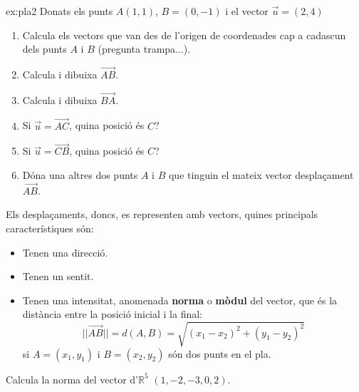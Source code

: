 \documentclass{beamer}
\begin{document}
\begin{frame}

\begin{exercise}{ex:pla2}{}
Donats els punts $A(1,1)$, $B=(0,-1)$ i el vector $\vec{u}=(2,4)$
\begin{enumerate}
  \item Calcula els vectors que van des de l'origen de coordenades cap a cadascun dels punts $A$ i $B$ (pregunta trampa...).
  \item Calcula i dibuixa $\overrightarrow{AB}$.
  \item Calcula i dibuixa $\overrightarrow{BA}$.
  \item Si $\vec{u}=\overrightarrow{AC}$, quina posició és $C$?
  \item Si $\vec{u}=\overrightarrow{CB}$, quina posició és $C$?
  \item Dóna una altres dos punts $A$ i $B$ que tinguin el mateix vector desplaçament $\overrightarrow{AB}$.
\end{enumerate}
\end{exercise}

\end{frame}
\begin{frame}
Els desplaçaments, doncs, es representen amb vectors, quines principals característiques són:
\begin{itemize}
  \item Tenen una direcció.
  \item Tenen un sentit.
  \item Tenen una intensitat, anomenada {\bf norma} o {\bf mòdul} del vector, que és la distància entre la posició inicial i la final:
  \begin{equation}
  ||\overrightarrow{AB}|| = d(A,B)=\sqrt{(x_1-x_2)^2+(y_1-y_2)^2}
  \end{equation}
  si $A=(x_1,y_1)$ i $B=(x_2,y_2)$ són dos punts en el pla.
\end{itemize}
\begin{exercise}{}{}
  Calcula la norma del vector d'$\mathbb{R}^5$ $(1,-2,-3,0,2)$.
\end{exercise}


\end{frame}
\end{document}
